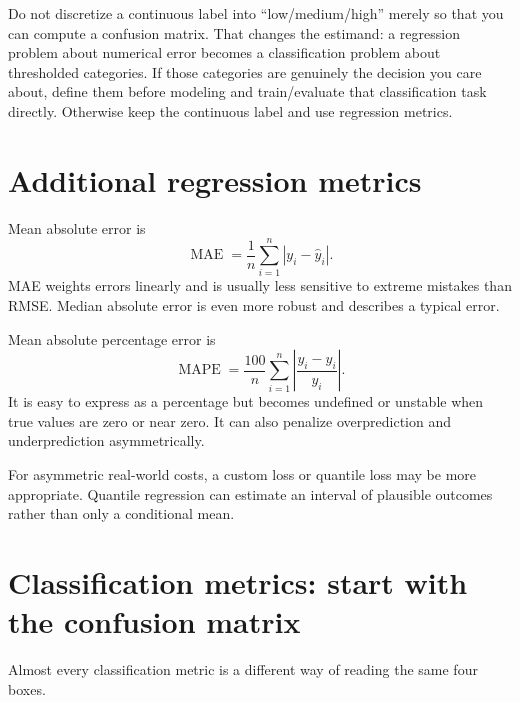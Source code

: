 \begin{pitfall}
Do not discretize a continuous label into ``low/medium/high'' merely so that you can compute a confusion matrix. That changes the estimand: a regression problem about numerical error becomes a classification problem about thresholded categories. If those categories are genuinely the decision you care about, define them before modeling and train/evaluate that classification task directly. Otherwise keep the continuous label and use regression metrics.
\end{pitfall}

\section{Additional regression metrics}

Mean absolute error is
\[
  \operatorname{MAE}
  =\frac{1}{n}\sum_{i=1}^{n}|y_i-\hat{y}_i|.
\]
MAE weights errors linearly and is usually less sensitive to extreme mistakes than RMSE\@. Median absolute error is even more robust and describes a typical error.

Mean absolute percentage error is
\[
  \operatorname{MAPE}
  =\frac{100}{n}\sum_{i=1}^{n}
  \left|\frac{y_i-\hat{y}_i}{y_i}\right|.
\]
It is easy to express as a percentage but becomes undefined or unstable when true values are zero or near zero. It can also penalize overprediction and underprediction asymmetrically.

For asymmetric real-world costs, a custom loss or quantile loss may be more appropriate. Quantile regression can estimate an interval of plausible outcomes rather than only a conditional mean.

\section{Classification metrics: start with the confusion matrix}
\label{sec:classification-metrics}

Almost every classification metric is a different way of reading the same four boxes.

